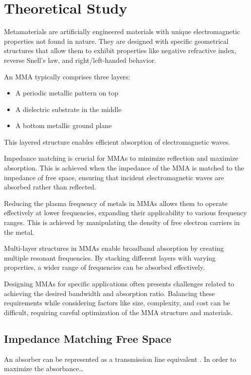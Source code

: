 \section{\textsf{Theoretical Study}}
    Metamaterials are artificially engineered materials with unique electromagnetic properties
    not found in nature. They are designed with specific geometrical structures that allow them
    to exhibit properties like negative refractive index, reverse Snell's law, and right/left-handed
    behavior. 
    
    An MMA typically comprises three layers: 
    \begin{itemize}
        \item A periodic metallic pattern on top
        \item A dielectric substrate in the middle
        \item A bottom metallic ground plane
    \end{itemize}
    This layered structure enables efficient absorption of electromagnetic waves.

    Impedance matching is crucial for MMAs to minimize reflection and maximize absorption. 
    This is achieved when the impedance of the MMA is matched to the impedance of free space,
    ensuring that incident electromagnetic waves are absorbed rather than reflected.
    
    Reducing the plasma frequency of metals in MMAs allows them to operate effectively at 
    lower frequencies, expanding their applicability to various frequency ranges. 
    This is achieved by manipulating the density of free electron carriers in the metal.

    Multi-layer structures in MMAs enable broadband absorption by creating multiple resonant
    frequencies. By stacking different layers with varying properties, a wider range of 
    frequencies can be absorbed effectively.


    Designing MMAs for specific applications often presents challenges related to achieving 
    the desired bandwidth and absorption ratio. Balancing these requirements while considering
    factors like size, complexity, and cost can be difficult, requiring careful optimization
    of the MMA structure and materials.

    \subsection{\textsf{Impedance Matching Free Space}}
        An absorber can be represented as a transmission line equivalent
        \cite{biswas_ultra-wideband_2022}. In order to maximize the absorbance\dots 

